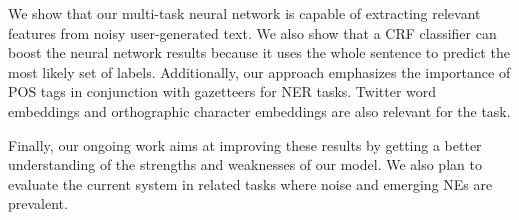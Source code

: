 \documentclass[11pt,letterpaper]{article}
\begin{document}
We show that our multi-task neural network is capable of extracting relevant features from noisy user-generated text. We also show that a CRF classifier can boost the neural network results because it uses the whole sentence to predict the most likely set of labels. Additionally, our approach emphasizes the importance of POS tags in conjunction with gazetteers for NER tasks. Twitter word embeddings and orthographic character embeddings are also relevant for the task.

Finally, our ongoing work aims at improving these results by getting a better understanding of the strengths and weaknesses of our model. We also plan to evaluate the current system in related tasks where noise and emerging NEs are prevalent.




\end{document}
